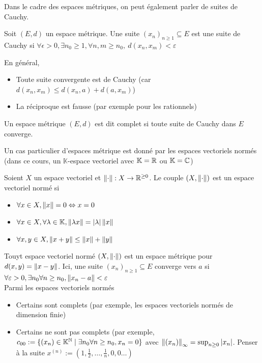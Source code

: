     Dans le cadre des espaces métriques, on peut également parler de suites de Cauchy.
    \begin{definition}
        Soit $(E,d)$ un espace métrique. Une suite $(x_n)_{n\ge 1}\subseteq E$ est une suite de Cauchy si $\forall\epsilon>0,\exists n_0\ge 1,\forall n,m\ge n_0,\ d(x_n,x_m)<\varepsilon$
    \end{definition}
    \begin{proposition}
    En général,\begin{itemize}
        \item Toute suite convergente est de Cauchy (car $d(x_n,x_m)\le d(x_n,a) + d(a,x_m)$)
        \item La réciproque est fausse (par exemple pour les rationnels)
    \end{itemize}       
\end{proposition}
\begin{definition}
    Un espace métrique $(E,d)$ est dit complet si toute suite de Cauchy dans $E$ converge.
\end{definition}
Un cas particulier d'espaces métrique est donné par les espaces vectoriels normés (dans ce cours, un $\mathbb K$-espace vectoriel avec $\mathbb K =\mathbb{R}$ ou $\mathbb K = \mathbb{C}$)
\begin{definition}
    Soient $X$ un espace vectoriel et $\left\| \cdot \right\| : X\to \mathbb{R}^{\ge 0}$. Le couple $(X,\left\| \cdot \right\|)$ est un espace vectoriel normé si
    \begin{itemize}
        \item $\forall x\in X, \left\| x \right\| = 0\Leftrightarrow x = 0$
        \item $\forall x\in X,\forall\lambda\in\mathbb K, \left\| \lambda x \right\| = |\lambda|\left\| x \right\|$
        \item $\forall x,y\in X, \left\| x+y \right\|\le \left\| x \right\| + \left\| y \right\|$
    \end{itemize}
\end{definition}
Touyt espace vectoriel normé $(X,\left\| \cdot \right\|)$ est un espace métrique pour $d(x,y) = \left\| x-y \right\|$. Ici, une suite $(x_n)_{n\ge 1}\subseteq E$ converge vers $a$ si $\forall\varepsilon >0,\exists n_0\forall n\ge n_0, \left\| x_n-a \right\|<\varepsilon$\\
Parmi les espaces vectoriels normés\begin{itemize}
    \item Certains sont complets (par exemple, les espaces vectoriels normés de dimension finie)
    \item Certains ne sont pas complets (par exemple, $c_{00}:=\{(x_n)\in\mathbb K^{\mathbb{N}}\mid \exists n_0\forall n\ge n_0, x_n = 0\}$ avec $\left\| (x_n) \right\|_\infty = \sup_{n\ge 0}\left| x_n \right|$. Penser à la suite $x^{(n)} := (1,\frac12,\dotsc,\frac1n,0,0\dots)$
\end{itemize}

